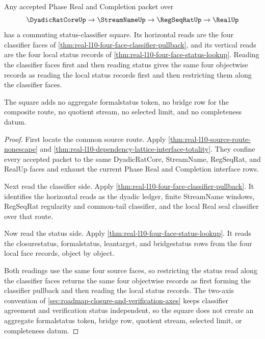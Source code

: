 \begin{theorem}
\label{thm:real-l10-four-face-status-classifier-square}
Any accepted Phase Real and Completion packet over
$$
\DyadicRatCoreUp \to \StreamNameUp \to \RegSeqRatUp \to \RealUp
$$
has a commuting status-classifier square. Its horizontal reads are the four
classifier faces of \autoref{thm:real-l10-four-face-classifier-pullback}, and
its vertical reads are the four local status records of
\autoref{thm:real-l10-four-face-status-lookup}. Reading the classifier faces
first and then reading status gives the same four objectwise records as
reading the local status records first and then restricting them along the
classifier faces.

The square adds no aggregate formalstatus token, no bridge row for the
composite route, no quotient stream, no selected limit, and no completeness
datum.
\end{theorem}
\begin{proof}
First locate the common source route. Apply
\autoref{thm:real-l10-source-route-nonescape} and
\autoref{thm:real-l10-dependency-lattice-interface-totality}. They confine
every accepted packet to the same DyadicRatCore, StreamName, RegSeqRat, and
RealUp faces and exhaust the current Phase Real and Completion interface rows.

Next read the classifier side. Apply
\autoref{thm:real-l10-four-face-classifier-pullback}. It identifies the
horizontal reads as the dyadic ledger, finite StreamName windows, RegSeqRat
regularity and common-tail classifier, and the local Real seal classifier over
that route.

Now read the status side. Apply
\autoref{thm:real-l10-four-face-status-lookup}. It reads the closurestatus,
formalstatus, leantarget, and bridgestatus rows from the four local face
records, object by object.

Both readings use the same four source faces, so restricting the status read
along the classifier faces returns the same four objectwise records as first
forming the classifier pullback and then reading the local status records. The
two-axis convention of \autoref{sec:roadmap-closure-and-verification-axes}
keeps classifier agreement and verification status independent, so the square
does not create an aggregate formalstatus token, bridge row, quotient stream,
selected limit, or completeness datum.
\end{proof}



